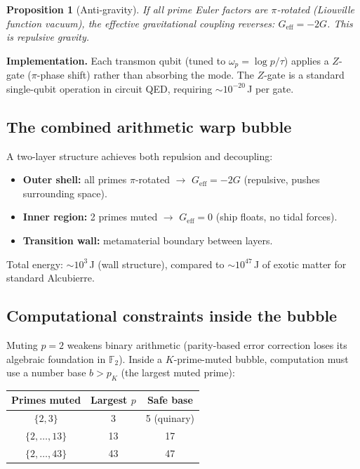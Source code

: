 \documentclass[aps,prd,twocolumn,superscriptaddress,nofootinbib]{revtex4-2}
\newtheorem{proposition}[theorem]{Proposition}
\begin{document}
\begin{proposition}[Anti-gravity]
If all prime Euler factors are $\pi$-rotated
(Liouville function vacuum), the effective gravitational coupling
reverses: $G_{\mathrm{eff}} = -2G$.
This is repulsive gravity.
\end{proposition}

\textbf{Implementation.}
Each transmon qubit (tuned to $\omega_p = \log p / \tau$) applies
a $Z$-gate ($\pi$-phase shift) rather than absorbing the mode.
The $Z$-gate is a standard single-qubit operation in circuit QED,
requiring $\sim 10^{-20}$\,J per gate.

\subsection{The combined arithmetic warp bubble}

A two-layer structure achieves both repulsion and decoupling:
\begin{itemize}
\item \textbf{Outer shell:} all primes $\pi$-rotated $\to$
  $G_{\mathrm{eff}} = -2G$ (repulsive, pushes surrounding space).
\item \textbf{Inner region:} 2 primes muted $\to$
  $G_{\mathrm{eff}} = 0$ (ship floats, no tidal forces).
\item \textbf{Transition wall:} metamaterial boundary between layers.
\end{itemize}

Total energy: $\sim 10^3$\,J (wall structure),
compared to $\sim 10^{47}$\,J of exotic matter for
standard Alcubierre.

\subsection{Computational constraints inside the bubble}

Muting $p = 2$ weakens binary arithmetic (parity-based error correction
loses its algebraic foundation in $\mathbb{F}_2$).
Inside a $K$-prime-muted bubble, computation must use a number base
$b > p_K$ (the largest muted prime):

\begin{center}
\begin{tabular}{ccc}
\toprule
Primes muted & Largest $p$ & Safe base \\
\midrule
$\{2,3\}$ & 3 & 5 (quinary) \\
$\{2,\ldots,13\}$ & 13 & 17 \\
$\{2,\ldots,43\}$ & 43 & 47 \\
\bottomrule
\end{tabular}
\end{center}
\end{document}
